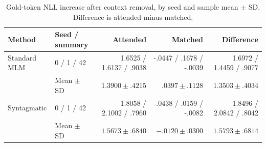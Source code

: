 \begin{table}[H]
\centering
\small
\begin{tabular}{llrrr}
\toprule
Method & Seed / summary & Attended & Matched & Difference \\
\midrule
Standard MLM & 0 / 1 / 42 & 1.6525 / 1.6137 / .9038 & -.0447 / .1678 / -.0039 & 1.6972 / 1.4459 / .9077 \\
 & Mean $\pm$ SD & $1.3900\pm.4215$ & $.0397\pm.1128$ & $1.3503\pm.4034$ \\
Syntagmatic & 0 / 1 / 42 & 1.8058 / 2.1002 / .7960 & -.0438 / .0159 / -.0082 & 1.8496 / 2.0842 / .8042 \\
 & Mean $\pm$ SD & $1.5673\pm.6840$ & $-.0120\pm.0300$ & $1.5793\pm.6814$ \\
\bottomrule
\end{tabular}
\caption{Gold-token NLL increase after context removal, by seed and sample mean $\pm$ SD. Difference is attended minus matched.}
\label{tab:context-removal}
\end{table}
